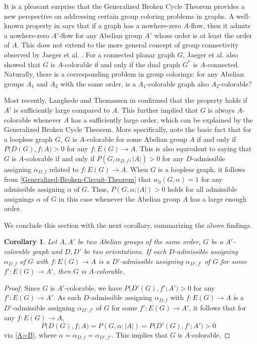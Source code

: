 \documentclass[12pt]{article}%
\numberwithin{equation}{section}
\newtheorem{corollary}[corollary]{Corollary}
\begin{document}
It is a pleasant surprise that the Generalized Broken Cycle Theorem provides a new perspective on addressing certain group coloring problems in graphs. A well-known property in \cite{Tutte1949} says that if a graph has a nowhere-zero $A$-flow, then it admits a nowhere-zero $A'$-flow for any Abelian group $A'$ whose order is at least the order of $A$. This does not extend to the more general concept of group connectivity observed by Jaeger et al. \cite{Jaeger1992}. For a connected planar graph $G$, Jaeger et al. \cite{Jaeger1992} also showed that $G$ is $A$-colorable if and only if the dual graph $G^*$ is $A$-connected. Naturally, there is a corresponding problem in group colorings: for any Abelian groups $A_1$ and $A_2$ with the same order, is a $A_1$-colorable graph also $A_2$-colorable? 

Most recently, Langhede and Thomassen in \cite{Langhede-Thomassen2020} confirmed that the property holds if $A'$ is sufficiently large compared to $A$. This further  implied that $G$ is always $A$-colorable whenever $A$ has a sufficiently large order, which can be explained by the Generalized Broken Cycle Theorem. More specifically, note the basic fact that for a loopless graph $G$, $G$ is $A$-colorable for some Abelian group $A$ if and only if $P\big(D(G),f;A\big)>0$ for any $f:E(G)\to A$. This is also equivalent to saying that $G$ is $A$-colorable if and only if $P(G,\alpha_{D,f};|A|)>0$ for any $D$-admissible assigning $\alpha_{D,f}$ related to $f:E(G)\to A$. When $G$ is a loopless graph, it follows from \autoref{Generalized-Broken-Circuit-Theorem} that $w_0(G,\alpha)=1$ for any admissible assigning $\alpha$ of $G$. Thus, $P(G,\alpha;|A|)>0$ holds for all admissible assignings $\alpha$ of $G$ in this case whenever the Abelian group $A$ has a large enough order. 

We conclude this section with the next corollary, summarizing the above findings.
\begin{corollary}\label{Group-Connectivity}
Let $A,A'$ be two Abelian groups of the same order, $G$ be a $A'$-colorable graph and $D,D'$ be two orientations. If  each $D$-admissible assigning $\alpha_{D,f}$ of $G$ with $f:E(G)\to A$ is a $D'$-admissible assigning $\alpha_{D',f'}$ of $G$ for some $f':E(G)\to A'$, then $G$ is $A$-colorable.
\end{corollary}
\begin{proof}
Since $G$ is $A'$-colorable, we have $P\big(D'(G),f';A'\big)>0$ for any $f':E(G)\to A'$. As each $D$-admissible assigning $\alpha_{D,f}$ with $f:E(G)\to A$ is a $D'$-admissible assigning $\alpha_{D',f'}$ of $G$ for some $f':E(G)\to A'$,  it follows that for any $f:E(G)\to A$, 
\[
P\big(D(G),f;A\big)=P(G,\alpha;|A|)=P\big(D'(G),f';A'\big)>0
\] 
via \autoref{A=B}, where $\alpha=\alpha_{D,f}=\alpha_{D',f'}$. This implies that $G$ is $A$-colorable.
\end{proof}
\end{document}
